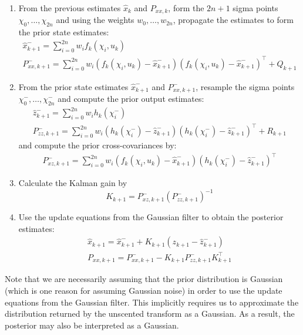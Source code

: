 \documentclass[11pt]{report} %
\begin{document}
\begin{enumerate}
\item From the previous estimates $\hat{x}_{k}$ and $P_{xx, k}$, form the $2n + 1$ sigma points $\chi_{0}, \dots, \chi_{2n}$ and using the weights $w_{0}, \dots, w_{2n}$, propagate the estimates to form the prior state estimates:
\begin{gather}
\hat{x}_{k + 1}^{-} = \sum_{i = 0}^{2n}w_{i}f_{k}\left(\chi_{i}, u_{k}\right) \\
P_{xx, k + 1}^{-} = \sum_{i = 0}^{2n}w_{i}\left(f_{k}\left(\chi_{i}, u_{k}\right) - \hat{x}_{k + 1}^{-}\right)\left(f_{k}\left(\chi_{i}, u_{k}\right) - \hat{x}_{k + 1}^{-}\right)^{\top} + Q_{k + 1}
\end{gather}
\item From the prior state estimates $\hat{x}_{k + 1}^{-}$ and $P_{xx, k + 1}^{-}$, resample the sigma points $\chi_{0}^{-}, \dots, \chi_{2n}^{-}$ and compute the prior output estimates:
\begin{gather}
\hat{z}_{k + 1}^{-} = \sum_{i = 0}^{2n}w_{i}h_{k}\left(\chi_{i}^{-}\right) \\
P_{zz, k + 1}^{-} = \sum_{i = 0}^{2n}w_{i}\left(h_{k}\left(\chi_{i}^{-}\right) - \hat{z}_{k + 1}^{-}\right)\left(h_{k}\left(\chi_{i}^{-}\right) - \hat{z}_{k + 1}^{-}\right)^{\top} + R_{k + 1}
\end{gather}
and compute the prior cross-covariances by:
\begin{gather}
P_{xz, k + 1}^{-} = \sum_{i = 0}^{2n}w_{i}\left(f_{k}\left(\chi_{i}, u_{k}\right) - \hat{x}_{k + 1}^{-}\right)\left(h_{k}\left(\chi_{i}^{-}\right) - \hat{z}_{k + 1}^{-}\right)^{\top}
\end{gather}
\item Calculate the Kalman gain by
\begin{equation}
K_{k + 1} = P_{xz, k + 1}^{-}\left(P_{zz, k + 1}^{-}\right)^{-1}
\end{equation}
\item Use the update equations from the Gaussian filter to obtain the posterior estimates:
\begin{gather}
\hat{x}_{k + 1} = \hat{x}_{k + 1}^{-} + K_{k + 1}\left(z_{k + 1} - \hat{z}_{k + 1}^{-}\right) \\
P_{xx, k + 1} = P_{xx, k + 1}^{-} - K_{k + 1}P_{zz, k + 1}^{-}K_{k + 1}^{\top}
\end{gather}
\end{enumerate}
Note that we are necessarily assuming that the prior distribution is Gaussian (which is one reason for assuming Gaussian noise) in order to use the update equations from the Gaussian filter. This implicitly requires us to approximate the distribution returned by the unscented transform as a Gaussian. As a result, the posterior may also be interpreted as a Gaussian.
\end{document}
